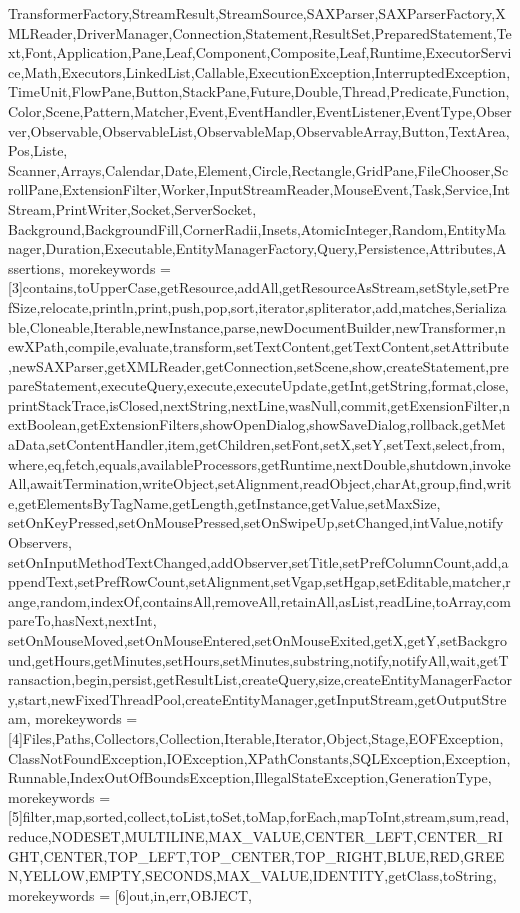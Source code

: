 {{    TransformerFactory,StreamResult,StreamSource,SAXParser,SAXParserFactory,XMLReader,DriverManager,Connection,Statement,ResultSet,PreparedStatement,Text,Font,Application,Pane,Leaf,Component,Composite,Leaf,Runtime,ExecutorService,Math,Executors,LinkedList,Callable,ExecutionException,InterruptedException,TimeUnit,FlowPane,Button,StackPane,Future,Double,Thread,Predicate,Function,Color,Scene,Pattern,Matcher,Event,EventHandler,EventListener,EventType,Observer,Observable,ObservableList,ObservableMap,ObservableArray,Button,TextArea,Pos,Liste,%
    Scanner,Arrays,Calendar,Date,Element,Circle,Rectangle,GridPane,FileChooser,ScrollPane,ExtensionFilter,Worker,InputStreamReader,MouseEvent,Task,Service,IntStream,PrintWriter,Socket,ServerSocket,%
    Background,BackgroundFill,CornerRadii,Insets,AtomicInteger,Random,EntityManager,Duration,Executable,EntityManagerFactory,Query,Persistence,Attributes,Assertions},
    morekeywords = [3]{contains,toUpperCase,getResource,addAll,getResourceAsStream,setStyle,setPrefSize,relocate,println,print,push,pop,sort,iterator,spliterator,add,matches,Serializable,Cloneable,Iterable,newInstance,parse,newDocumentBuilder,newTransformer,newXPath,compile,evaluate,transform,setTextContent,getTextContent,setAttribute,newSAXParser,getXMLReader,getConnection,setScene,show,createStatement,prepareStatement,executeQuery,execute,executeUpdate,getInt,getString,format,close,printStackTrace,isClosed,nextString,nextLine,wasNull,commit,getExensionFilter,nextBoolean,getExtensionFilters,showOpenDialog,showSaveDialog,rollback,getMetaData,setContentHandler,item,getChildren,setFont,setX,setY,setText,select,from,where,eq,fetch,equals,availableProcessors,getRuntime,nextDouble,shutdown,invokeAll,awaitTermination,writeObject,setAlignment,readObject,charAt,group,find,write,getElementsByTagName,getLength,getInstance,getValue,setMaxSize,%
    setOnKeyPressed,setOnMousePressed,setOnSwipeUp,setChanged,intValue,notifyObservers, setOnInputMethodTextChanged,addObserver,setTitle,setPrefColumnCount,add,appendText,setPrefRowCount,setAlignment,setVgap,setHgap,setEditable,matcher,range,random,indexOf,containsAll,removeAll,retainAll,asList,readLine,toArray,compareTo,hasNext,nextInt,%
    setOnMouseMoved,setOnMouseEntered,setOnMouseExited,getX,getY,setBackground,getHours,getMinutes,setHours,setMinutes,substring,notify,notifyAll,wait,getTransaction,begin,persist,getResultList,createQuery,size,createEntityManagerFactory,start,newFixedThreadPool,createEntityManager,getInputStream,getOutputStream},
    morekeywords = [4]{Files,Paths,Collectors,Collection,Iterable,Iterator,Object,Stage,EOFException,ClassNotFoundException,IOException,XPathConstants,SQLException,Exception,Runnable,IndexOutOfBoundsException,IllegalStateException,GenerationType},
    morekeywords = [5]{filter,map,sorted,collect,toList,toSet,toMap,forEach,mapToInt,stream,sum,read,reduce,NODESET,MULTILINE,MAX_VALUE,CENTER_LEFT,CENTER_RIGHT,CENTER,TOP_LEFT,TOP_CENTER,TOP_RIGHT,BLUE,RED,GREEN,YELLOW,EMPTY,SECONDS,MAX_VALUE,IDENTITY,getClass,toString},
    morekeywords = [6]{out,in,err,OBJECT},
}




